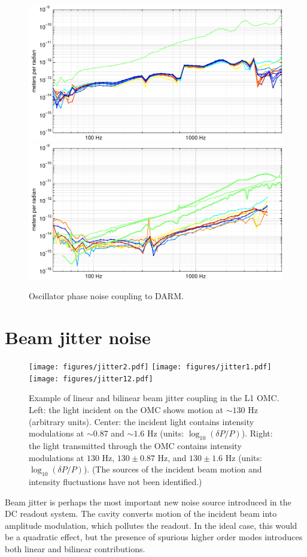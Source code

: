 \begin{figure} %
\includegraphics[]{figures/oscPM-L1.pdf}
\includegraphics[]{figures/oscPM-H1.pdf}
\caption[Oscillator phase noise coupling (measured)]{\label{fig:osc-PM}Oscillator phase noise coupling to DARM.}
\end{figure}

\section{Beam jitter noise}



\begin{figure}[t]
\texttt{[image: figures/jitter2.pdf]}
\texttt{[image: figures/jitter1.pdf]}
\texttt{[image: figures/jitter12.pdf]}
\caption[Example of linear and bilinear beam jitter
  coupling]{\label{fig:jitter-mechanism}Example of linear and bilinear
  beam jitter coupling in the L1 OMC.  Left: the light incident on the
  OMC shows motion at $\sim 130$ Hz (arbitrary units).  Center: the incident light
  contains intensity modulations at $\sim 0.87$ and $\sim 1.6$
  Hz (units: $\log_{10} (\delta{}P/P)$). Right: the light transmitted through the OMC contains intensity
  modulations at $130$ Hz, $130 \pm 0.87$ Hz, and $ 130 \pm 1.6$ Hz (units: $\log_{10} (\delta{}P/P)$).
  (The sources of the incident beam motion and intensity fluctuations
  have not been identified.)}
\end{figure}
Beam jitter is perhaps the most important new noise source introduced
in the DC readout system.  The cavity converts motion of the incident
beam into amplitude modulation, which pollutes the readout.  In the
ideal case, this would be a quadratic effect, but the presence of
spurious higher order modes introduces both linear and bilinear contributions.

